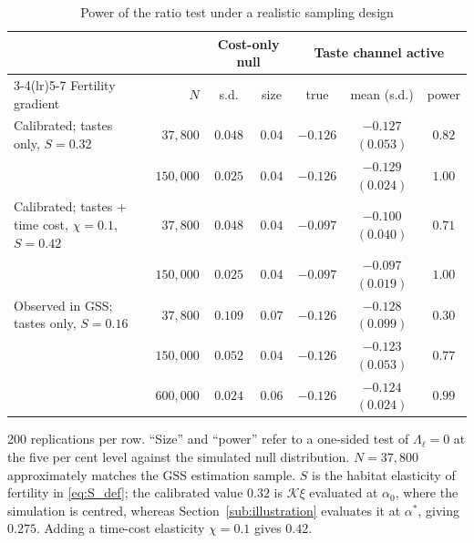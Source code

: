 \documentclass[11pt]{article}
\begin{document}
\begin{table}[h!]\centering
\begin{threeparttable}
\caption{Power of the ratio test under a realistic sampling design}
\label{tab:power}
\footnotesize\setlength{\tabcolsep}{3.5pt}
\begin{tabular}{lrccccc}
\toprule
& & \multicolumn{2}{c}{Cost-only null} & \multicolumn{3}{c}{Taste channel active}\\
\cmidrule(lr){3-4}\cmidrule(lr){5-7}
Fertility gradient & $N$ & s.d. & size & true & mean (s.d.) & power\\
\midrule
Calibrated; tastes only, $S=0.32$           & $37{,}800$  & $0.048$ & $0.04$ & $-0.126$ & $-0.127$ $(0.053)$ & $0.82$\\
                                           & $150{,}000$ & $0.025$ & $0.04$ & $-0.126$ & $-0.129$ $(0.024)$ & $1.00$\\
Calibrated; tastes + time cost, $\chi=0.1$, $S=0.42$ & $37{,}800$ & $0.048$ & $0.04$ & $-0.097$ & $-0.100$ $(0.040)$ & $0.71$\\
                                           & $150{,}000$ & $0.025$ & $0.04$ & $-0.097$ & $-0.097$ $(0.019)$ & $1.00$\\
Observed in GSS; tastes only, $S=0.16$  & $37{,}800$ & $0.109$ & $0.07$ & $-0.126$ & $-0.128$ $(0.099)$ & $0.30$\\
                                           & $150{,}000$ & $0.052$ & $0.04$ & $-0.126$ & $-0.123$ $(0.053)$ & $0.77$\\
                                           & $600{,}000$ & $0.024$ & $0.06$ & $-0.126$ & $-0.124$ $(0.024)$ & $0.99$\\
\bottomrule
\end{tabular}
\begin{tablenotes}\footnotesize
\item 200 replications per row. ``Size'' and ``power'' refer to a one-sided test of $\Lambda_\ell=0$ at
the five per cent level against the simulated null distribution. $N=37{,}800$ approximately matches the GSS
estimation sample. $S$ is the habitat elasticity of fertility in \eqref{eq:S_def}; the calibrated
value $0.32$ is $\mathcal{K}\xi$ evaluated at $\alpha_0$, where the simulation is centred, whereas
Section~\ref{sub:illustration} evaluates it at $\alpha^\ast$, giving $0.275$. Adding a time-cost
elasticity $\chi=0.1$ gives $0.42$.
\end{tablenotes}
\end{threeparttable}
\end{table}
\end{document}
